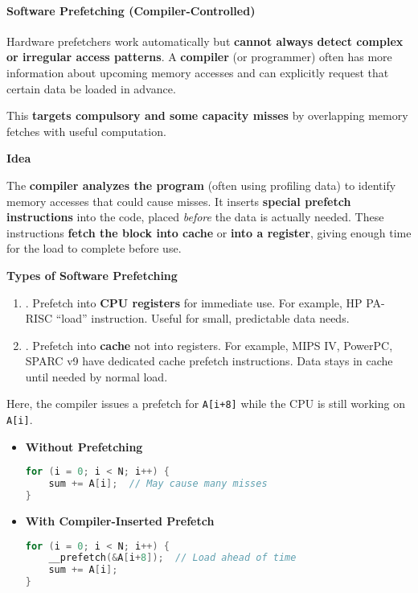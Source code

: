 \paragraph{Software Prefetching (Compiler-Controlled)}

Hardware prefetchers work automatically but \textbf{cannot always detect complex or irregular access patterns}. A \textbf{compiler} (or programmer) often has more information about upcoming memory accesses and can explicitly request that certain data be loaded in advance.

\highspace
This \textbf{targets compulsory and some capacity misses} by overlapping memory fetches with useful computation.

\highspace
\begin{flushleft}
    \textcolor{Green3}{ \textbf{Idea}}
\end{flushleft}
The \textbf{compiler analyzes the program} (often using profiling data) to identify memory accesses that could cause misses. It inserts \textbf{special prefetch instructions} into the code, placed \emph{before} the data is actually needed. These instructions \textbf{fetch the block into cache} or \textbf{into a register}, giving enough time for the load to complete before use.

\highspace
\begin{flushleft}
    \textcolor{Green3}{ \textbf{Types of Software Prefetching}}
\end{flushleft}
\begin{enumerate}
    \item {}. Prefetch into \textbf{CPU registers} for immediate use. For example, HP PA-RISC ``load'' instruction. Useful for small, predictable data needs.
    \item {}. Prefetch into \textbf{cache} not into registers. For example, MIPS IV, PowerPC, SPARC v9 have dedicated cache prefetch instructions. Data stays in cache until needed by normal load.
\end{enumerate}
\begin{examplebox}
    Here, the compiler issues a prefetch for \texttt{A[i+8]} while the CPU is still working on \texttt{A[i]}.
    \begin{itemize}
        \item \textbf{Without Prefetching}
        \begin{lstlisting}[language=c]
for (i = 0; i < N; i++) {
    sum += A[i];  // May cause many misses
}\end{lstlisting}
        \item \textbf{With Compiler-Inserted Prefetch}
        \begin{lstlisting}[language=c]
for (i = 0; i < N; i++) {
    __prefetch(&A[i+8]);  // Load ahead of time
    sum += A[i];
}\end{lstlisting}
    \end{itemize}
\end{examplebox}


